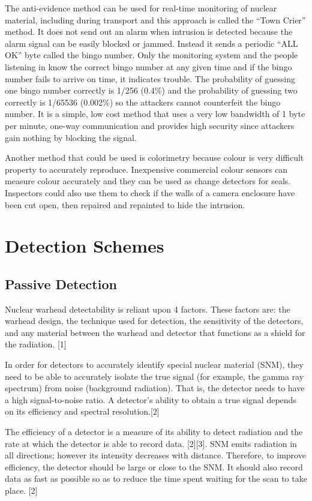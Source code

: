 \documentclass[twoside,titlepage,11pt,twocolumn,a4paper]{article}
\begin{document}
The anti-evidence method can be used for real-time monitoring of
nuclear material, including during transport and this approach is
called the ``Town Crier'' method. It does not send out an alarm when
intrusion is detected because the alarm signal can be easily blocked
or jammed. Instead it sends a periodic ``ALL OK'' byte called the
bingo number. Only the monitoring system and the people listening in
know the correct bingo number at any given time and if the bingo
number fails to arrive on time, it indicates trouble. The probability
of guessing one bingo number correctly is 1/256 (0.4\%) and the
probability of guessing two correctly is 1/65536 (0.002\%) so the
attackers cannot counterfeit the bingo number. It is a simple, low
cost method that uses a very low bandwidth of 1 byte per minute,
one-way communication and provides high security since attackers gain
nothing by blocking the signal. \citep{unconventionalCoC2010}

Another method that could be used is colorimetry because colour is very
difficult property to accurately reproduce. Inexpensive commercial
colour sensors can measure colour accurately and they can be used as
change detectors for seals. Inspectors could also use them to check if
the walls of a camera enclosure have been cut open, then repaired and
repainted to hide the intrusion. \citep{unconventionalCoC2010}

\section{Detection Schemes}
\subsection{Passive Detection}

Nuclear warhead detectability is reliant upon 4 factors. These factors
are: the warhead design, the technique used for detection, the
sensitivity of the detectors, and any material between the warhead and
detector that functions as a shield for the radiation. [1]

In order for detectors to accurately identify special nuclear material
(SNM), they need to be able to accurately isolate the true signal (for
example, the gamma ray spectrum) from noise (background
radiation). That is, the detector needs to have a high signal-to-noise
ratio. A detector’s ability to obtain a true signal depends on its
efficiency and spectral resolution.[2]

The efficiency of a detector is a measure of its ability to detect
radiation and the rate at which the detector is able to record
data. [2][3]. SNM emits radiation in all directions; however its
intensity decreases with distance. Therefore, to improve efficiency,
the detector should be large or close to the SNM. It should also
record data as fast as possible so as to reduce the time spent waiting
for the scan to take place. [2]
\end{document}
